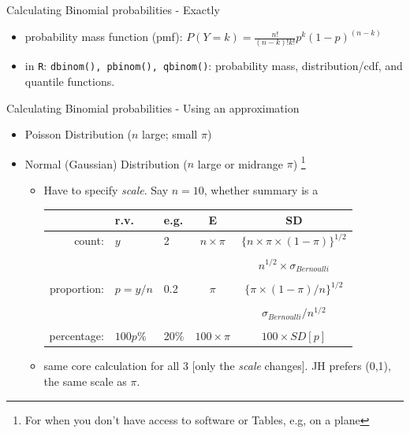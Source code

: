 \documentclass{beamer}\usepackage[]{graphicx}\usepackage[]{color}
\begin{document}
\begin{frame}{Calculating Binomial probabilities - Exactly}



\begin{itemize}
	\item  probability mass function (pmf): $P(Y=k) =
	\frac{n!}{(n-k)!k!}p^k(1-p)^{(n-k)}$
	\item in \texttt{R}: \texttt{dbinom(), pbinom(), qbinom()}: \newline probability mass, distribution/cdf, and quantile functions.
\end{itemize}

\end{frame}




\begin{frame}{Calculating Binomial probabilities - Using an approximation}

\small
\begin{itemize}
	\item Poisson Distribution ($n$ large;  small $\pi$)
	\item Normal (Gaussian) Distribution ($n$ large or midrange $\pi $) \footnote{\footnotesize
		For when you don't have access to software or Tables, e.g, on a plane} 
	\begin{itemize}
		\item Have to specify \textit{scale}. Say $n=10$, whether summary is a 
		\begin{tabular}{rllcc}
			&  \textbf{r.v. }        &  \textbf{e.g.} & \textbf{E} & \textbf{SD} \\ 
			\hline
			count:          &  $y$        &  2 & $n \times \pi$ & $\{n \times \pi \times (1-\pi) \}^{1/2}$ \\
			& & & & \\
			& & & & $n^{1/2} \times \sigma_{Bernoulli}$ \\
			
			& & & & \\
			proportion:   & $p=y/n$  & 0.2 & $ \pi$ & $\{\pi \times (1-\pi) / n \}^{1/2}$ \\
			& & & & \\
			
			& & & &  $\sigma_{Bernoulli} / n^{1/2}$\\
			
			& & & & \\
			percentage: &$100p\%$ & 20\% & $100 \times \pi$ & $100 \times SD[p]$ \\
			\hline
		\end{tabular}
		\item same core calculation for all 3 [only the \textit{scale} changes]. JH prefers (0,1), the same scale as $\pi.$
		
	\end{itemize}
	
\end{itemize}

\end{frame}
\end{document}
